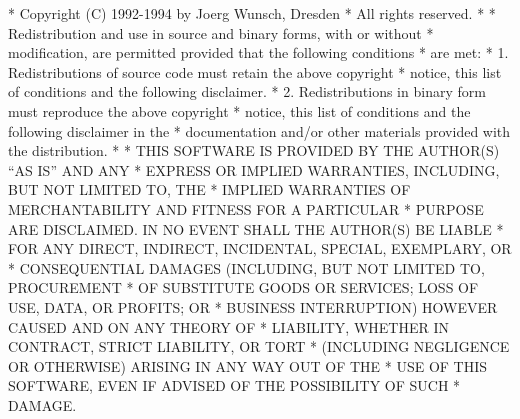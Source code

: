 \begin{copyrightEnv}
 * Copyright (C) 1992-1994 by Joerg Wunsch, Dresden
 * All rights reserved.
 *
 * Redistribution and use in source and binary forms, with or without
 * modification, are permitted provided that the following conditions
 * are met:
 * 1. Redistributions of source code must retain the above copyright
 *    notice, this list of conditions and the following disclaimer.
 * 2. Redistributions in binary form must reproduce the above copyright
 *    notice, this list of conditions and the following disclaimer in the
 *    documentation and/or other materials provided with the distribution.
 *
 * THIS SOFTWARE IS PROVIDED BY THE AUTHOR(S) ``AS IS'' AND ANY
 * EXPRESS OR IMPLIED WARRANTIES, INCLUDING, BUT NOT LIMITED TO, THE
 * IMPLIED WARRANTIES OF MERCHANTABILITY AND FITNESS FOR A PARTICULAR
 * PURPOSE ARE DISCLAIMED.  IN NO EVENT SHALL THE AUTHOR(S) BE LIABLE
 * FOR ANY DIRECT, INDIRECT, INCIDENTAL, SPECIAL, EXEMPLARY, OR
 * CONSEQUENTIAL DAMAGES (INCLUDING, BUT NOT LIMITED TO, PROCUREMENT
 * OF SUBSTITUTE GOODS OR SERVICES; LOSS OF USE, DATA, OR PROFITS; OR
 * BUSINESS INTERRUPTION) HOWEVER CAUSED AND ON ANY THEORY OF
 * LIABILITY, WHETHER IN CONTRACT, STRICT LIABILITY, OR TORT
 * (INCLUDING NEGLIGENCE OR OTHERWISE) ARISING IN ANY WAY OUT OF THE
 * USE OF THIS SOFTWARE, EVEN IF ADVISED OF THE POSSIBILITY OF SUCH
 * DAMAGE.
\end{copyrightEnv}

